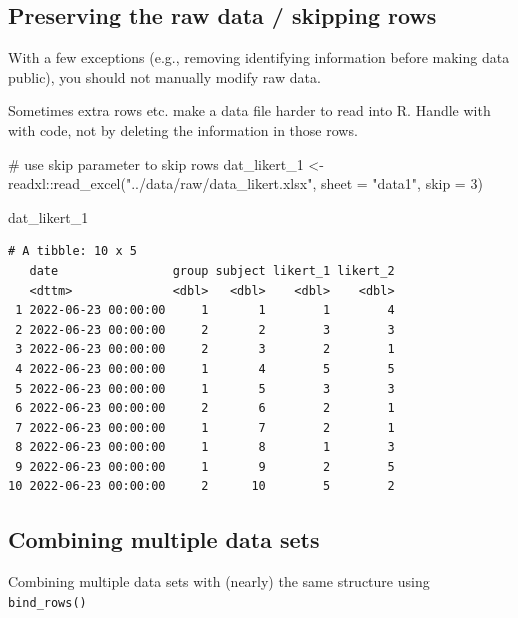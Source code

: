 \documentclass[
  letterpaper,
  DIV=11,
  numbers=noendperiod]{scrreprt}
\newenvironment{Shaded}{\begin{snugshade}}{\end{snugshade}}
\newcommand{\AttributeTok}[1]{\textcolor[rgb]{0.40,0.45,0.13}{#1}}
\newcommand{\CommentTok}[1]{\textcolor[rgb]{0.37,0.37,0.37}{#1}}
\newcommand{\DecValTok}[1]{\textcolor[rgb]{0.68,0.00,0.00}{#1}}
\newcommand{\FunctionTok}[1]{\textcolor[rgb]{0.28,0.35,0.67}{#1}}
\newcommand{\NormalTok}[1]{\textcolor[rgb]{0.00,0.23,0.31}{#1}}
\newcommand{\OtherTok}[1]{\textcolor[rgb]{0.00,0.23,0.31}{#1}}
\newcommand{\SpecialCharTok}[1]{\textcolor[rgb]{0.37,0.37,0.37}{#1}}
\newcommand{\StringTok}[1]{\textcolor[rgb]{0.13,0.47,0.30}{#1}}
\begin{document}
\subsection{Preserving the raw data / skipping
rows}\label{preserving-the-raw-data-skipping-rows}

With a few exceptions (e.g., removing identifying information before
making data public), you should not manually modify raw data.

Sometimes extra rows etc. make a data file harder to read into R. Handle
with with code, not by deleting the information in those rows.

\begin{Shaded}
\begin{Highlighting}[]
\CommentTok{\# use skip parameter to skip rows}
\NormalTok{dat\_likert\_1 }\OtherTok{\textless{}{-}}\NormalTok{ readxl}\SpecialCharTok{::}\FunctionTok{read\_excel}\NormalTok{(}\StringTok{"../data/raw/data\_likert.xlsx"}\NormalTok{, }\AttributeTok{sheet =} \StringTok{"data1"}\NormalTok{, }\AttributeTok{skip =} \DecValTok{3}\NormalTok{)}

\NormalTok{dat\_likert\_1}
\end{Highlighting}
\end{Shaded}

\begin{verbatim}
# A tibble: 10 x 5
   date                group subject likert_1 likert_2
   <dttm>              <dbl>   <dbl>    <dbl>    <dbl>
 1 2022-06-23 00:00:00     1       1        1        4
 2 2022-06-23 00:00:00     2       2        3        3
 3 2022-06-23 00:00:00     2       3        2        1
 4 2022-06-23 00:00:00     1       4        5        5
 5 2022-06-23 00:00:00     1       5        3        3
 6 2022-06-23 00:00:00     2       6        2        1
 7 2022-06-23 00:00:00     1       7        2        1
 8 2022-06-23 00:00:00     1       8        1        3
 9 2022-06-23 00:00:00     1       9        2        5
10 2022-06-23 00:00:00     2      10        5        2
\end{verbatim}

\subsection{Combining multiple data
sets}\label{combining-multiple-data-sets}

Combining multiple data sets with (nearly) the same structure using
\texttt{bind\_rows()}
\end{document}
